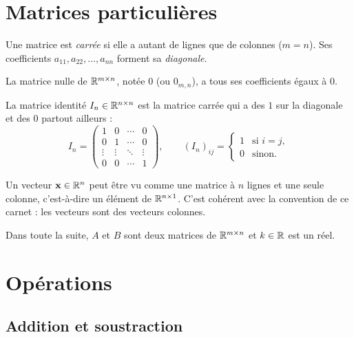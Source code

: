 \section{Matrices particulières}

\begin{definition}
Une matrice est \emph{carrée} si elle a autant de
lignes que de colonnes ($m = n$). Ses coefficients
$a_{11}, a_{22}, \dots, a_{nn}$ forment sa
\emph{diagonale}.
\end{definition}

\begin{definition}
La matrice nulle de $\mathbb{R}^{m \times n}$, notée $0$
(ou $0_{m,n}$), a tous ses coefficients égaux à $0$.
\end{definition}

\begin{definition}
La matrice identité $I_n \in \mathbb{R}^{n \times n}$ est la
matrice carrée qui a des $1$ sur la diagonale et des
$0$ partout ailleurs :
\[
    I_n =
    \begin{pmatrix}
        1 & 0 & \cdots & 0 \\
        0 & 1 & \cdots & 0 \\
        \vdots & \vdots & \ddots & \vdots \\
        0 & 0 & \cdots & 1
    \end{pmatrix},
    \qquad
    (I_n)_{ij} =
    \begin{cases}
        1 & \text{si } i = j, \\
        0 & \text{sinon.}
    \end{cases}
\]
\end{definition}

\begin{remark}
Un vecteur $\mathbf{x} \in \mathbb{R}^n$ peut être vu comme une
matrice à $n$ lignes et une seule colonne, c'est-à-dire
un élément de $\mathbb{R}^{n \times 1}$. C'est cohérent avec la
convention de ce carnet : les vecteurs sont des
vecteurs colonnes.
\end{remark}

Dans toute la suite, $A$ et $B$ sont deux matrices
de $\mathbb{R}^{m \times n}$ et $k \in \mathbb{R}$ est un réel.

\section{Opérations}

\subsection{Addition et soustraction}

